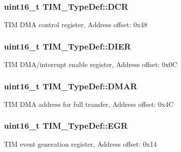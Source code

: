\subsubsection[{\texorpdfstring{D\+CR}{DCR}}]{ uint16\+\_\+t T\+I\+M\+\_\+\+Type\+Def\+::\+D\+CR}\hypertarget{struct_t_i_m___type_def_ad3186a43824621f049e7eff37c88ad4e}{}\label{struct_t_i_m___type_def_ad3186a43824621f049e7eff37c88ad4e}
T\+IM D\+MA control register, Address offset\+: 0x48 
\subsubsection[{\texorpdfstring{D\+I\+ER}{DIER}}]{ uint16\+\_\+t T\+I\+M\+\_\+\+Type\+Def\+::\+D\+I\+ER}\hypertarget{struct_t_i_m___type_def_a25b145e57a694bb384eee08fcd107c3a}{}\label{struct_t_i_m___type_def_a25b145e57a694bb384eee08fcd107c3a}
T\+IM D\+M\+A/interrupt enable register, Address offset\+: 0x0C 
\subsubsection[{\texorpdfstring{D\+M\+AR}{DMAR}}]{ uint16\+\_\+t T\+I\+M\+\_\+\+Type\+Def\+::\+D\+M\+AR}\hypertarget{struct_t_i_m___type_def_a4e0fbb52e6dd4bdabcb3f3b2f4bae40c}{}\label{struct_t_i_m___type_def_a4e0fbb52e6dd4bdabcb3f3b2f4bae40c}
T\+IM D\+MA address for full transfer, Address offset\+: 0x4C 
\subsubsection[{\texorpdfstring{E\+GR}{EGR}}]{ uint16\+\_\+t T\+I\+M\+\_\+\+Type\+Def\+::\+E\+GR}\hypertarget{struct_t_i_m___type_def_a724fd21b7131fb9ac78c1b661dee3a8d}{}\label{struct_t_i_m___type_def_a724fd21b7131fb9ac78c1b661dee3a8d}
T\+IM event generation register, Address offset\+: 0x14 
